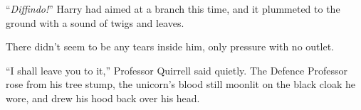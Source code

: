 “\emph{Diffindo!}” Harry had aimed at a branch this time, and it plummeted to the ground with a sound of twigs and leaves.

There didn’t seem to be any tears inside him, only pressure with no outlet.

“I shall leave you to it,” Professor Quirrell said quietly. The Defence Professor rose from his tree stump, the unicorn’s blood still moonlit on the black cloak he wore, and drew his hood back over his head.
